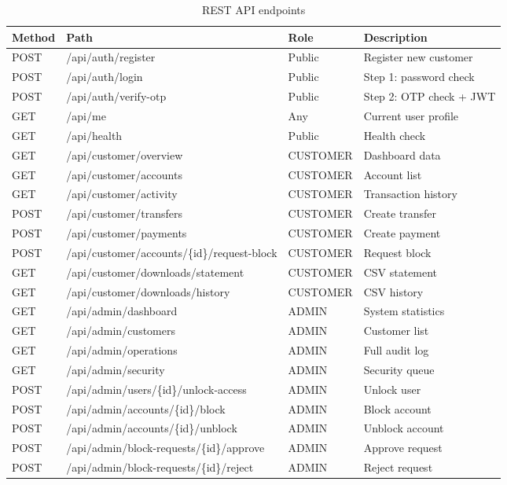 \documentclass[12pt,a4paper]{report}
\begin{document}
\begin{table}[H]
  \centering
  \caption{REST API endpoints}
  \label{tab:api}
  \begin{tabular}{lllp{5cm}}
    \toprule
    \textbf{Method} & \textbf{Path} & \textbf{Role} & \textbf{Description} \\
    \midrule
    POST & /api/auth/register           & Public   & Register new customer \\
    POST & /api/auth/login              & Public   & Step 1: password check \\
    POST & /api/auth/verify-otp         & Public   & Step 2: OTP check + JWT \\
    GET  & /api/me                      & Any      & Current user profile \\
    GET  & /api/health                  & Public   & Health check \\
    \midrule
    GET  & /api/customer/overview       & CUSTOMER & Dashboard data \\
    GET  & /api/customer/accounts       & CUSTOMER & Account list \\
    GET  & /api/customer/activity       & CUSTOMER & Transaction history \\
    POST & /api/customer/transfers      & CUSTOMER & Create transfer \\
    POST & /api/customer/payments       & CUSTOMER & Create payment \\
    POST & /api/customer/accounts/\{id\}/request-block & CUSTOMER & Request block \\
    GET  & /api/customer/downloads/statement & CUSTOMER & CSV statement \\
    GET  & /api/customer/downloads/history   & CUSTOMER & CSV history \\
    \midrule
    GET  & /api/admin/dashboard         & ADMIN    & System statistics \\
    GET  & /api/admin/customers         & ADMIN    & Customer list \\
    GET  & /api/admin/operations        & ADMIN    & Full audit log \\
    GET  & /api/admin/security          & ADMIN    & Security queue \\
    POST & /api/admin/users/\{id\}/unlock-access     & ADMIN & Unlock user \\
    POST & /api/admin/accounts/\{id\}/block          & ADMIN & Block account \\
    POST & /api/admin/accounts/\{id\}/unblock        & ADMIN & Unblock account \\
    POST & /api/admin/block-requests/\{id\}/approve  & ADMIN & Approve request \\
    POST & /api/admin/block-requests/\{id\}/reject   & ADMIN & Reject request \\
    \bottomrule
  \end{tabular}
\end{table}
\end{document}
